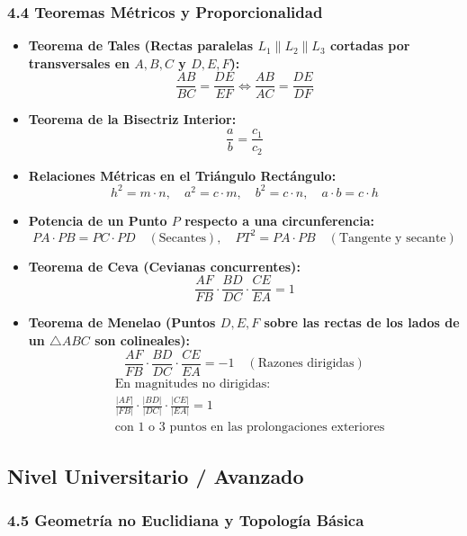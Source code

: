 \documentclass[11pt,a4paper]{article}
\begin{document}
\subsubsection*{4.4 Teoremas Métricos y Proporcionalidad}

\begin{itemize}
  \item \textbf{Teorema de Tales (Rectas paralelas $L_1 \parallel L_2 \parallel L_3$ cortadas por transversales en $A, B, C$ y $D, E, F$):}
  \[
    \frac{AB}{BC} = \frac{DE}{EF} \iff \frac{AB}{AC} = \frac{DE}{DF}
  \]
  \item \textbf{Teorema de la Bisectriz Interior:}
  \[
    \frac{a}{b} = \frac{c_1}{c_2}
  \]
  \item \textbf{Relaciones Métricas en el Triángulo Rectángulo:}
  \[
    h^2 = m \cdot n, \quad a^2 = c \cdot m, \quad b^2 = c \cdot n, \quad a \cdot b = c \cdot h
  \]
  \item \textbf{Potencia de un Punto $P$ respecto a una circunferencia:}
  \[
    PA \cdot PB = PC \cdot PD \quad (\text{Secantes}), \quad PT^2 = PA \cdot PB \quad (\text{Tangente y secante})
  \]
  \item \textbf{Teorema de Ceva (Cevianas concurrentes):}
  \[
    \frac{AF}{FB} \cdot \frac{BD}{DC} \cdot \frac{CE}{EA} = 1
  \]
  \item \textbf{Teorema de Menelao (Puntos $D, E, F$ sobre las rectas de los lados de un $\triangle ABC$ son colineales):}
  \[
    \frac{AF}{FB} \cdot \frac{BD}{DC} \cdot \frac{CE}{EA} = -1 \quad (\text{Razones dirigidas})
  \]
  \[
    \begin{aligned}
      &\text{En magnitudes no dirigidas:} \\
      &\frac{|AF|}{|FB|} \cdot \frac{|BD|}{|DC|} \cdot \frac{|CE|}{|EA|} = 1 \\
      &\text{con 1 o 3 puntos en las prolongaciones exteriores}
    \end{aligned}
  \]
\end{itemize}

\subsection*{Nivel Universitario / Avanzado}

\subsubsection*{4.5 Geometría no Euclidiana y Topología Básica}
\end{document}
